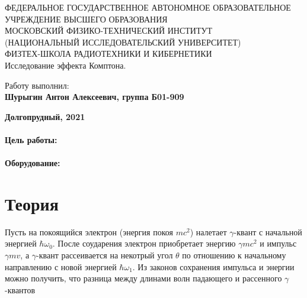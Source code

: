 \documentclass[15pt,a5paper,reqno]{article}
\begin{document}
\begin{center}
  {\small ФЕДЕРАЛЬНОЕ ГОСУДАРСТВЕННОЕ АВТОНОМНОЕ ОБРАЗОВАТЕЛЬНОЕ\\ УЧРЕЖДЕНИЕ ВЫСШЕГО ОБРАЗОВАНИЯ\\ МОСКОВСКИЙ ФИЗИКО-ТЕХНИЧЕСКИЙ ИНСТИТУТ\\ (НАЦИОНАЛЬНЫЙ ИССЛЕДОВАТЕЛЬСКИЙ УНИВЕРСИТЕТ)\\ ФИЗТЕХ-ШКОЛА РАДИОТЕХНИКИ И КИБЕРНЕТИКИ}\\
  \hfill \break
  \hfill \break
  \hfill \break
  \Huge{Исследование эффекта Комптона.}\\
\end{center}

\hfill \break
\hfill \break
\hfill \break
\hfill \break
\hfill \break
\hfill \break

\begin{flushright}
  \normalsize{Работу выполнил:}\\
  \normalsize{\textbf{Шурыгин Антон Алексеевич, группа Б01-909}}\\
\end{flushright}

\begin{center}
  \normalsize{\textbf{Долгопрудный, 2021}}
\end{center}


\thispagestyle{empty} %


\newpage
\thispagestyle{plain}
\tableofcontents
\thispagestyle{plain}
\newpage

\paragraph{Цель работы:}
\paragraph{Оборудование:}


\section{Теория}

Пусть на покоящийся электрон (энергия покоя $mc^2$) налетает $\gamma$-квант с начальной энергией $\hbar \omega_0$. После соударения электрон приобретает энергию $\gamma mc^2$ и импульс $\gamma mv$, а $\gamma$-квант рассеивается на некотрый угол $\theta$ по отношению к начальному направлению с новой энергией $\hbar \omega_1$. Из законов сохранения импульса и энергии можно получить, что разница между длинами волн падающего и рассенного $\gamma$-квантов
\end{document}
